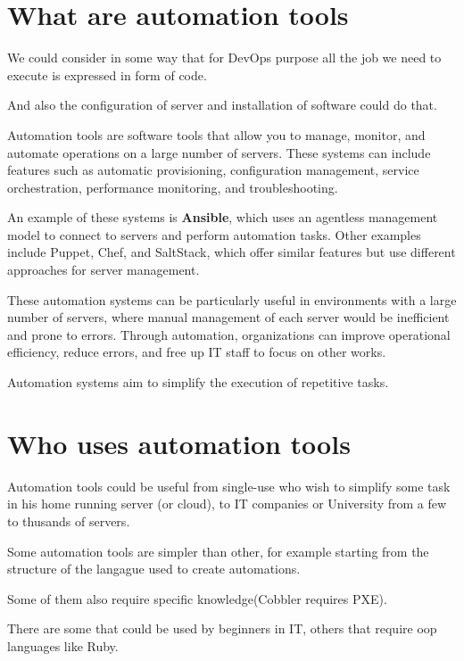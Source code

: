 \documentclass[12pt,a4paper,openright,twoside]{book}
\begin{document}
\section{What are automation tools}
We could consider in some way that for DevOps purpose all the job we need to execute is expressed in form of code\cite{learnDevOps}.


And also the configuration of server and installation of software could do that.


Automation tools are software tools that allow you to manage, monitor, and automate operations on a large number of servers. These systems can include features such as automatic provisioning, configuration management, service orchestration, performance monitoring, and troubleshooting.


An example of these systems is \textbf{Ansible}, which uses an agentless management model to connect to servers and perform automation tasks. Other examples include Puppet, Chef, and SaltStack, which offer similar features but use different approaches for server management.


These automation systems can be particularly useful in environments with a large number of servers, where manual management of each server would be inefficient and prone to errors. Through automation, organizations can improve operational efficiency, reduce errors, and free up IT staff to focus on other works.


Automation systems aim to simplify the execution of repetitive tasks.

\section{Who uses automation tools}
Automation tools could be useful from single-use who wish to simplify some task in his home running server (or cloud), to IT companies or University from a few to thusands of servers.


Some automation tools are simpler than other, for example starting from the structure of the langague used to create automations.


Some of them also require specific knowledge(Cobbler requires PXE).


There are some that could be used by beginners in IT, others that require oop languages like Ruby.
\end{document}
